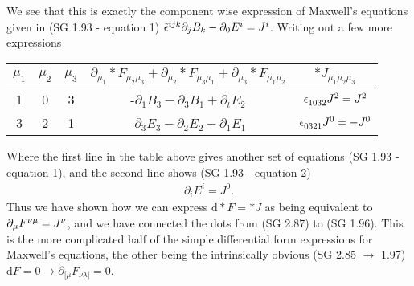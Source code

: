 %
We see that this is exactly the component wise expression of Maxwell's equations given in (SG 1.93 - equation 1) $\tilde{\epsilon}\indices{^{ijk}}\partial_j B_k - \partial_0 E^i = J^i$. Writing out a few more expressions 
%
\begin{center}
	\begin{tabular}{| c | c | c | c | c |} 
		\hline
		$\mu_1$ & $\mu_2$ & $\mu_3$ & $\partial_{\mu_1} \ast F_{\mu_2\mu_3} + \partial_{\mu_2} \ast F_{\mu_3\mu_1} + \partial_{\mu_3} \ast F_{\mu_1\mu_2}$ & $\ast J_{\mu_1 \mu_2 \mu_3}$ \\
		\hline\hline
		1 & 0 & 3 &  -$\partial_{1} B_3 - \partial_{3} B_1 + \partial_{t} E_2$ & $\epsilon\indices{_{{1}{0}{3}{2}}}J^2 = J^2$\\
		3 & 2 & 1 &  -$\partial_{3} E_3 - \partial_{2} E_2 - \partial_{1} E_1$ & $\epsilon\indices{_{{0}{3}{2}{1}}}J^0 = -J^0$\\
		\hline
	\end{tabular}
\end{center}
%
Where the first line in the table above gives another set of equations (SG 1.93 - equation 1), and the second line shows (SG 1.93 - equation 2) 
%
\begin{align} \label{gauss_step_1}
	\partial_i E^i = J^0.
\end{align}
%
Thus we have shown how we can express $ \textrm{d} \ast F = \ast J $ as being equivalent to $\partial_\mu F\indices{^{\nu\mu}} = J^\nu$, and we have connected the dots from (SG 2.87) to (SG 1.96). This is the more complicated half of the simple differential form expressions for Maxwell's equations, the other being the intrinsically obvious (SG 2.85 $\rightarrow$ 1.97) $ \textrm{d} F = 0 \rightarrow \partial_{[\mu}F_{\nu\lambda]} = 0$. 


